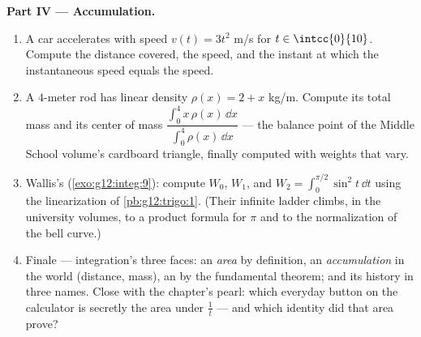 \begin{problem}
\medskip
\noindent\textbf{Part IV --- Accumulation.}
\begin{enumerate}[resume]
  \item A car accelerates with speed $v(t) = 3t^2$ m/s for
        $t \in \intcc{0}{10}$. Compute the distance covered,
        the  speed, and the instant at which the
        instantaneous speed equals the  speed.
  \item A $4$-meter rod has linear density
        $\rho(x) = 2 + x$ kg/m. Compute its total mass and its
        center of mass
        $\dfrac{\int_0^4 x\,\rho(x)\,\dd x}{\int_0^4
        \rho(x)\,\dd x}$ --- the balance point of the Middle
        School volume's cardboard triangle, finally computed
        with weights that vary.
  \item Wallis's  (\cref{exo:g12:integ:9}): compute
        $W_0$, $W_1$, and
        $W_2 = \int_0^{\pi/2} \sin^2 t\,\dd t$ using the
        linearization of \cref{pb:g12:trigo:1}. (Their infinite
        ladder climbs, in the university volumes, to a product
        formula for $\pi$ and to the normalization of the bell
        curve.)
  \item Finale --- integration's three faces: an \emph{area}
        by definition, an \emph{accumulation} in the world
        (distance, mass), an \emph{} by the
        fundamental theorem; and its history in three names.
        Close with the chapter's pearl: which everyday button
        on the calculator is secretly the area under
        $\frac1t$ --- and which identity did that area prove?
\end{enumerate}
\end{problem}
